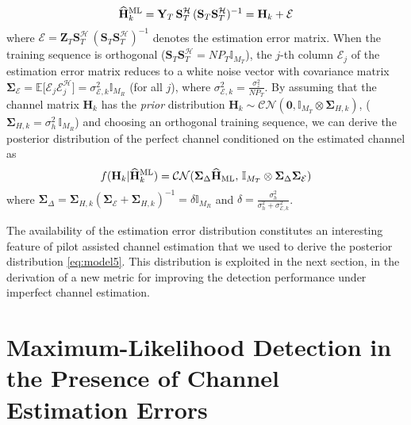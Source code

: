 \documentclass{article}
\def\cro#1{\left[#1\right]}                \def\stdcro#1{[#1]}
\def\bigcro#1{\bigl[#1\bigr]}              \def\biggcro#1{\biggl[#1\biggr]}
\def\esp{{\mathrm{E}}\,}              \def\Esp#1{{\mathrm{E}}\bigcro{#1}}  \def\Esph#1#2{\underset{{#1}}{\mathrm{E}}\bigcro{#2}}               \def\Espold#1{{\mathrm{E}}\cro{#1}}
\def\H{{\mathbf H}}
\def\HH{\widehat{{\mathbf H}}}
\def\tg{\mathcal{H}}
\def\esp{{\mathbb E}}
\def\eye{{\mathbb I}}
\def\sig{\mathbf \Sigma}
\begin{document}
\begin{equation}
\label{eq:model4}
\HH_k^{\rm ML}=\mathbf{Y}_T \,\mathbf{S}_T^\tg\,(\mathbf{S}_T\mathbf{S}_T^\tg)^{-1}=\H_k + \mathbf{\mathcal{E}}
\end{equation}
where $\mathbf{\mathcal{E}}= \mathbf{Z}_T \mathbf{S}_T^\tg\,(\mathbf{S}_T\mathbf{S}_T^\tg)^{-1}$ denotes the estimation error matrix. When the training sequence is orthogonal ($\mathbf{S}_T \mathbf{S}_T^\tg = N P_T \eye_{M_T}$), the $j$-th column $\mathbf{\mathcal{E}}
_j$ of the estimation error matrix reduces to a white noise vector with covariance matrix $\sig_{\mathcal{E}}= \esp\big[\boldsymbol{\mathcal{E}}_j \boldsymbol{\mathcal{E}}_j^\tg\big]=\sigma_{\mathcal{E},k}^2 \eye_{M_R}$ (for all $j$), where $\sigma_{\mathcal{E},k}^2=\frac{\sigma^2_z}{N P_T}$.
By assuming that the channel matrix $\H_k$ has the {\it prior} distribution $\H_k \sim \mathcal{CN}(\mathbf{0},\eye_{M_T} \otimes \sig_{H,k})$, ($\sig_{H,k}=\sigma^2_h\, \eye_{M_R}$) and choosing an orthogonal training sequence, we can derive the posterior distribution of the perfect channel conditioned on the estimated channel as
\begin{equation}
\label{eq:model5}
f(\H_k|\HH_k^{\rm ML}) = \mathcal{CN}( \sig_{\Delta} \HH_{\rm ML} ,\, \eye_{M_T} \otimes \sig_{\Delta} \sig_{ \mathcal{E} } )
\end{equation}
where $\sig_{\Delta}=\sig_{H,k}(\sig_{\mathcal{E}}+\sig_{H,k})^{-1}=\delta \eye_{M_R}$ and $\delta=\frac{ \sigma^2_h}{\sigma^2_h+\sigma^2_{\mathcal{E},k}}$.

The availability of the estimation error distribution constitutes an interesting feature of pilot assisted channel estimation that we used to derive the posterior distribution \eqref{eq:model5}. This distribution is exploited in the next section, in the derivation of a new metric for improving the detection performance under imperfect channel estimation. \vspace{-2mm}
\section{Maximum-Likelihood Detection in the Presence of Channel Estimation Errors}
\label{sec:metric}
\vspace{-2mm}
\end{document}
